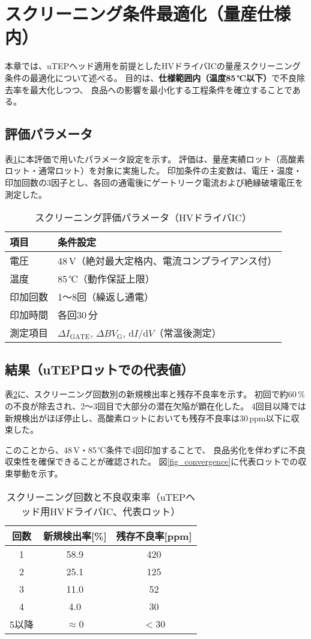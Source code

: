 \documentclass[twocolumn]{ieeetran}
\begin{document}
\section{スクリーニング条件最適化（量産仕様内）}
本章では、uTEPヘッド適用を前提としたHVドライバICの量産スクリーニング条件の最適化について述べる。
目的は、\textbf{仕様範囲内（温度85\,℃以下）}で不良除去率を最大化しつつ、
良品への影響を最小化する工程条件を確立することである。

\subsection{評価パラメータ}
表\ref{tab_param}に本評価で用いたパラメータ設定を示す。
評価は、量産実績ロット（高酸素ロット・通常ロット）を対象に実施した。
印加条件の主変数は、電圧・温度・印加回数の3因子とし、各回の通電後にゲートリーク電流および絶縁破壊電圧を測定した。

\begin{table}[t]
\centering
\caption{スクリーニング評価パラメータ（HVドライバIC）}
\label{tab_param}
\begin{tabular}{ll}
\toprule
項目 & 条件設定 \\
\midrule
電圧 & 48\,V（絶対最大定格内、電流コンプライアンス付） \\
温度 & 85\,℃（動作保証上限） \\
印加回数 & 1～8回（繰返し通電） \\
印加時間 & 各回30\,分 \\
測定項目 & $\Delta I_\mathrm{GATE}$, $\Delta BV_\mathrm{G}$, d$I$/d$V$（常温後測定） \\
\bottomrule
\end{tabular}
\end{table}

\subsection{結果（uTEPロットでの代表値）}
表\ref{tab_results}に、スクリーニング回数別の新規検出率と残存不良率を示す。
初回で約60\,\%の不良が除去され、2～3回目で大部分の潜在欠陥が顕在化した。
4回目以降では新規検出がほぼ停止し、高酸素ロットにおいても残存不良率は30\,ppm以下に収束した。

このことから、48\,V・85\,℃条件で4回印加することで、
良品劣化を伴わずに不良収束性を確保できることが確認された。
図\ref{fig_convergence}に代表ロットでの収束挙動を示す。

\begin{table}[t]
\centering
\caption{スクリーニング回数と不良収束率（uTEPヘッド用HVドライバIC、代表ロット）}
\label{tab_results}
\begin{tabular}{ccc}
\toprule
回数 & 新規検出率[\%] & 残存不良率[ppm] \\
\midrule
1 & 58.9 & 420 \\
2 & 25.1 & 125 \\
3 & 11.0 & 52 \\
4 & 4.0  & 30 \\
5以降 & $\approx$0 & $<$30 \\
\bottomrule
\end{tabular}
\end{table}
\end{document}
